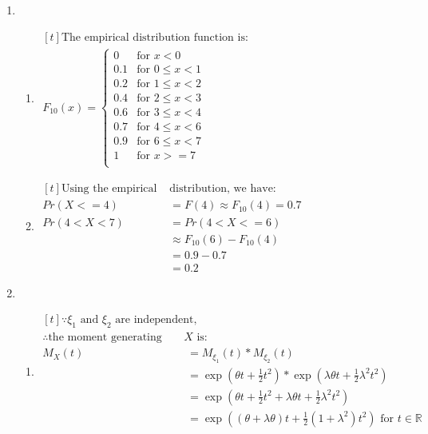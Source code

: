 \documentclass{article}
\begin{document}
\begin{enumerate}
    
\item
    \begin{enumerate}[label=(\roman*)]
    \item $\begin{aligned}[t]
    \text{The empirical distribution function is:} \\
    F_{10}(x) = \begin{cases}
        0 & \text{for } x < 0 \\
        0.1 & \text{for } 0 \leq x < 1 \\
        0.2 & \text{for } 1 \leq x < 2 \\
        0.4 & \text{for } 2 \leq x < 3 \\
        0.6 & \text{for } 3 \leq x < 4 \\
        0.7 & \text{for } 4 \leq x < 6 \\
        0.9 & \text{for } 6 \leq x < 7 \\
        1 & \text{for } x >= 7 \\
    \end{cases}
    \end{aligned}$

    \item $\begin{aligned}[t]
    \text{Using the empirical } & \text{distribution, we have:} \\
    Pr(X<=4) &= F(4) \approx F_{10}(4) = 0.7 \\
    Pr(4<X<7) &= Pr(4<X<=6) \\
    & \approx F_{10}(6) - F_{10}(4) \\
    &= 0.9 - 0.7 \\
    &= 0.2
    \end{aligned}$
    \end{enumerate}

\item
    \begin{enumerate}[label=(\roman*)]
    \item $\begin{aligned}[t]
    \because \xi_1 \text{ and } \xi_2 \text{ are independent,} \\
    \therefore \text{the moment generating function of } X \text{ is:} \\
    M_X(t) &= M_{\xi_1}(t) * M_{\xi_2}(t) \\
    &= \exp(\theta t + \frac{1}{2} t^2) * \exp(\lambda \theta t + \frac{1}{2}\lambda^2 t^2) \\
    &= \exp(\theta t + \frac{1}{2} t^2 + \lambda \theta t + \frac{1}{2}\lambda^2 t^2) \\
    &= \exp((\theta + \lambda \theta) t + \frac{1}{2} (1 + \lambda^2) t^2) \text{ for } t \in \mathbb{R} \\
    \end{aligned}$
    

\end{enumerate}
\end{enumerate}
\end{document}
